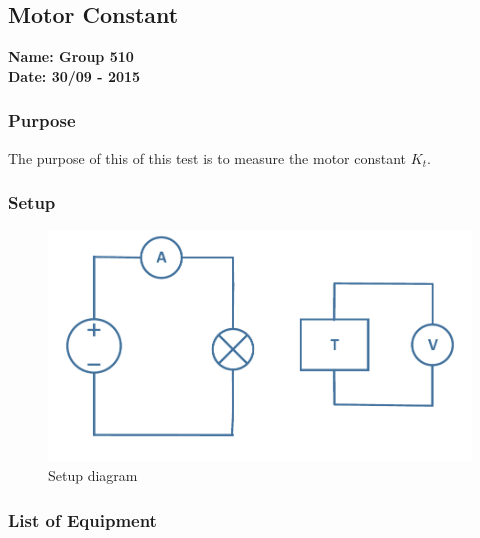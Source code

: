 \pagebreak
\subsection{Motor Constant} %
\textbf{Name: Group 510}\\
\textbf{Date: 30/09 - 2015}

\subsubsection{Purpose}
The purpose of this of this test is to measure the motor constant $K_t$.

\subsubsection{Setup}
\begin{figure}[H]
  \centering
	\includegraphics[scale=0.5]{figures/MotorTest5.pdf}
	\caption{Setup diagram}
\end{figure}

\subsubsection{List of Equipment}

